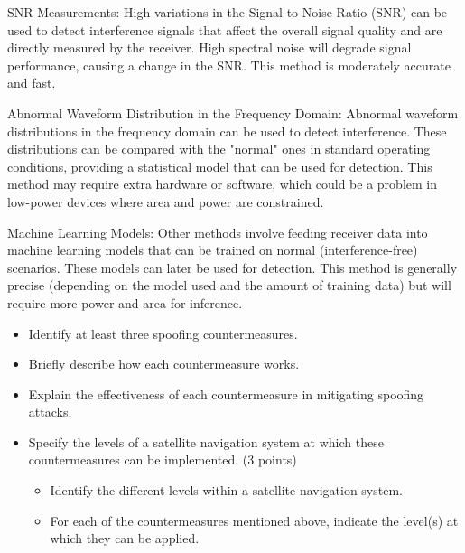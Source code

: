 \begin{questions}
\begin{solution}
        SNR Measurements: High variations in the Signal-to-Noise Ratio (SNR) can be used to detect interference signals that affect the overall signal quality and are directly measured by the receiver. High spectral noise will degrade signal performance, causing a change in the SNR. This method is moderately accurate and fast.

        Abnormal Waveform Distribution in the Frequency Domain: Abnormal waveform distributions in the frequency domain can be used to detect interference. These distributions can be compared with the "normal" ones in standard operating conditions, providing a statistical model that can be used for detection. This method may require extra hardware or software, which could be a problem in low-power devices where area and power are constrained.

        Machine Learning Models: Other methods involve feeding receiver data into machine learning models that can be trained on normal (interference-free) scenarios. These models can later be used for detection. This method is generally precise (depending on the model used and the amount of training data) but will require more power and area for inference.
    \end{solution}



    \begin{itemize}
        \item Identify at least three spoofing countermeasures.
        \item Briefly describe how each countermeasure works.
        \item Explain the effectiveness of each countermeasure in mitigating spoofing attacks.
        \item Specify the levels of a satellite navigation system at which these countermeasures can be implemented. (3 points)
              \begin{itemize}
                  \item Identify the different levels within a satellite navigation system.
                  \item For each of the countermeasures mentioned above, indicate the level(s) at which they can be applied.
              \end{itemize}
    \end{itemize}


\end{questions}
